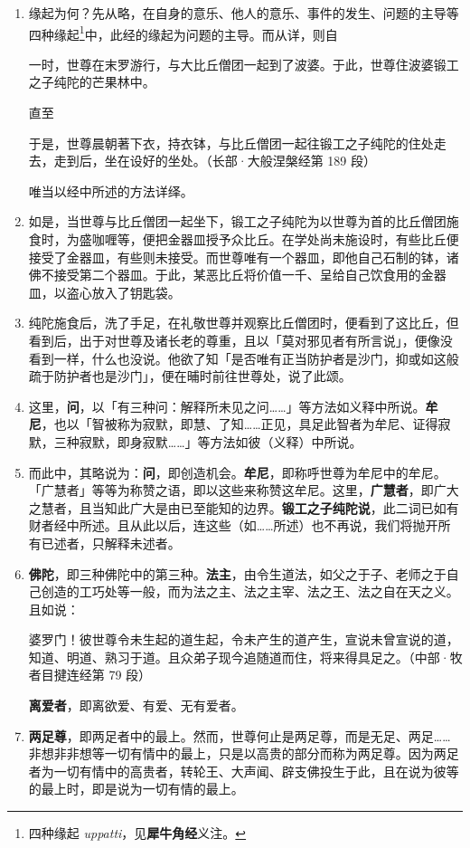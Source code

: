 \begin{enumerate}\item 缘起为何？先从略，在自身的意乐、他人的意乐、事件的发生、问题的主导等四种缘起\footnote{四种缘起 \textit{uppatti}，见\textbf{犀牛角经}义注。}中，此经的缘起为问题的主导。而从详，则自\begin{quoting}一时，世尊在末罗游行，与大比丘僧团一起到了波婆。于此，世尊住波婆锻工之子纯陀的芒果林中。\end{quoting}直至\begin{quoting}于是，世尊晨朝著下衣，持衣钵，与比丘僧团一起往锻工之子纯陀的住处走去，走到后，坐在设好的坐处。（长部·大般涅槃经第 189 段）\end{quoting}唯当以经中所述的方法详绎。
\item 如是，当世尊与比丘僧团一起坐下，锻工之子纯陀为以世尊为首的比丘僧团施食时，为盛咖喱等，便把金器皿授予众比丘。在学处尚未施设时，有些比丘便接受了金器皿，有些则未接受。而世尊唯有一个器皿，即他自己石制的钵，诸佛不接受第二个器皿。于此，某恶比丘将价值一千、呈给自己饮食用的金器皿，以盗心放入了钥匙袋。
\item 纯陀施食后，洗了手足，在礼敬世尊并观察比丘僧团时，便看到了这比丘，但看到后，出于对世尊及诸长老的尊重，且以「莫对邪见者有所言说」，便像没看到一样，什么也没说。他欲了知「是否唯有正当防护者是沙门，抑或如这般疏于防护者也是沙门」，便在晡时前往世尊处，说了此颂。
\item 这里，\textbf{问}，以「有三种问：解释所未见之问……」等方法如义释中所说。\textbf{牟尼}，也以「智被称为寂默，即慧、了知……正见，具足此智者为牟尼、证得寂默，三种寂默，即身寂默……」等方法如彼（义释）中所说。
\item 而此中，其略说为：\textbf{问}，即创造机会。\textbf{牟尼}，即称呼世尊为牟尼中的牟尼。「广慧者」等等为称赞之语，即以这些来称赞这牟尼。这里，\textbf{广慧者}，即广大之慧者，且当知此广大是由已至能知的边界。\textbf{锻工之子纯陀说}，此二词已如有财者经中所述。且从此以后，连这些（如……所述）也不再说，我们将抛开所有已述者，只解释未述者。
\item \textbf{佛陀}，即三种佛陀中的第三种。\textbf{法主}，由令生道法，如父之于子、老师之于自己创造的工巧处等一般，而为法之主、法之主宰、法之王、法之自在天之义。且如说：\begin{quoting}婆罗门！彼世尊令未生起的道生起，令未产生的道产生，宣说未曾宣说的道，知道、明道、熟习于道。且众弟子现今追随道而住，将来得具足之。（中部·牧者目揵连经第 79 段）\end{quoting}\textbf{离爱者}，即离欲爱、有爱、无有爱者。
\item \textbf{两足尊}，即两足者中的最上。然而，世尊何止是两足尊，而是无足、两足……非想非非想等一切有情中的最上，只是以高贵的部分而称为两足尊。因为两足者为一切有情中的高贵者，转轮王、大声闻、辟支佛投生于此，且在说为彼等的最上时，即是说为一切有情的最上。

\end{enumerate}
